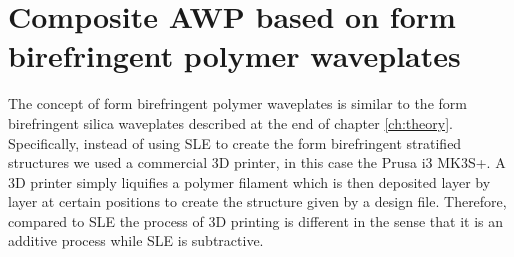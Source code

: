 
\section{Composite AWP based on form birefringent polymer waveplates}
The concept of form birefringent polymer waveplates is similar to the form birefringent silica waveplates described at the end of chapter \ref{ch:theory}. Specifically, instead of using SLE to create the form birefringent stratified structures we used a commercial 3D printer, in this case the Prusa i3 MK3S+. A 3D printer simply liquifies a polymer filament which is then deposited layer by layer at certain positions to create the structure given by a design file. Therefore, compared to SLE the process of 3D printing is different in the sense that it is an additive process while SLE is subtractive.  

